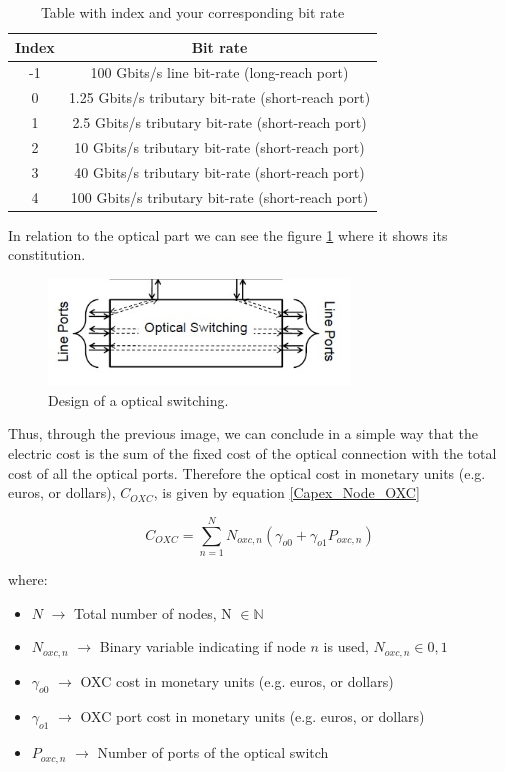 \begin{table}[h!]
\centering
\begin{tabular}{|c|c|}
  \hline
  Index & Bit rate \\
 \hline\hline
  -1 & 100 Gbits/s line bit-rate (long-reach port) \\
  0 & 1.25 Gbits/s tributary bit-rate (short-reach port) \\
  1 & 2.5 Gbits/s tributary bit-rate (short-reach port) \\
  2 & 10 Gbits/s tributary bit-rate (short-reach port) \\
  3 & 40 Gbits/s tributary bit-rate (short-reach port) \\
  4 & 100 Gbits/s tributary bit-rate (short-reach port) \\
  \hline
\end{tabular}
\caption{Table with index and your corresponding bit rate}
\label{table_bitrate}
\end{table}

\vspace{11pt}
In relation to the optical part we can see the figure \ref{oxc_design} where it shows its constitution.

\begin{figure}[h!]
\centering
\includegraphics[width=8cm]{sdf/ILP/figures/oxc_design}
\caption{Design of a optical switching.}
\label{oxc_design}
\end{figure}


Thus, through the previous image, we can conclude in a simple way that the electric cost is the sum of the fixed cost of the optical connection with the total cost of all the optical ports.
Therefore the optical cost in monetary units (e.g. euros, or dollars), $C_{OXC}$, is given by equation \ref{Capex_Node_OXC}

\begin{equation}
C_{OXC} = \sum_{n=1}^{N} N_{oxc,n} \left( \gamma_{o0} + \gamma_{o1} P_{oxc,n} \right)
\label{Capex_Node_OXC}
\end{equation}

where:
\begin{itemize}
\item{$N$				$\rightarrow$	Total number of nodes, N $\in \mathbb{N}$}
\item{$N_{oxc,n}$		$\rightarrow$	Binary variable indicating if node $n$ is used, $N_{oxc,n} \in {0, 1}$}
\item{$\gamma_{o0}$ 	$\rightarrow$	OXC cost in monetary units (e.g. euros, or dollars)}
\item{$\gamma_{o1}$ 	$\rightarrow$	OXC port cost in monetary units (e.g. euros, or dollars) }
\item{$P_{oxc,n}$	    $\rightarrow$	Number of ports of the optical switch}
\end{itemize}


